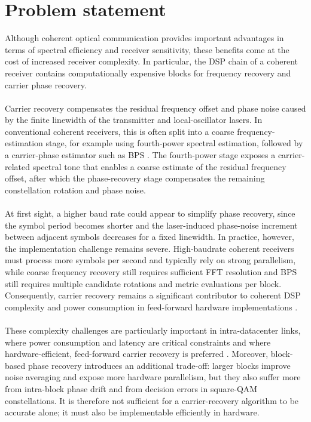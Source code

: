 \section{Problem statement}
Although coherent optical communication provides important advantages in terms of spectral efficiency and receiver sensitivity, these benefits come at the cost of increased receiver complexity. In particular, the \ac{DSP} chain of a coherent receiver contains computationally expensive blocks for frequency recovery and carrier phase recovery.
\\\\
Carrier recovery compensates the residual frequency offset and phase noise caused by the finite linewidth of the transmitter and local-oscillator lasers. In conventional coherent receivers, this is often split into a coarse frequency-estimation stage, for example using fourth-power spectral estimation, followed by a carrier-phase estimator such as \ac{BPS} \cite{Leven2007LPT,IpKahn2007JLT,Pfau2009JLT}. The fourth-power stage exposes a carrier-related spectral tone that enables a coarse estimate of the residual frequency offset, after which the phase-recovery stage compensates the remaining constellation rotation and phase noise.
\\\\
At first sight, a higher baud rate could appear to simplify phase recovery, since the symbol period becomes shorter and the laser-induced phase-noise increment between adjacent symbols decreases for a fixed linewidth. In practice, however, the implementation challenge remains severe. High-baudrate coherent receivers must process more symbols per second and typically rely on strong parallelism, while coarse frequency recovery still requires sufficient FFT resolution and \ac{BPS} still requires multiple candidate rotations and metric evaluations per block. Consequently, carrier recovery remains a significant contributor to coherent \ac{DSP} complexity and power consumption in feed-forward hardware implementations \cite{Kuschnerov2009JLT,Pfau2009JLT}.
\\
\\
These complexity challenges are particularly important in intra-datacenter links, where power consumption and latency are critical constraints and where hardware-efficient, feed-forward carrier recovery is preferred \cite{Pfau2009JLT,Seiler2021FOE}. Moreover, block-based phase recovery introduces an additional trade-off: larger blocks improve noise averaging and expose more hardware parallelism, but they also suffer more from intra-block phase drift and from decision errors in square-QAM constellations. It is therefore not sufficient for a carrier-recovery algorithm to be accurate alone; it must also be implementable efficiently in hardware.
